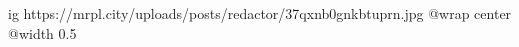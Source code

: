  
 
 
 
 

\ifcmt
  ig https://mrpl.city/uploads/posts/redactor/37qxnb0gnkbtuprn.jpg
  @wrap center
  @width 0.5
\fi
